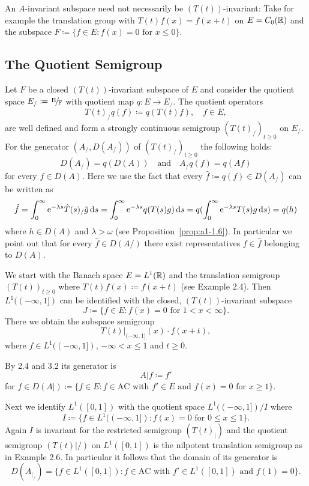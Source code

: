 An $A$-invariant subspace need not necessarily be $(T(t))$-invariant:
Take for example the translation group with $T(t)f(x) = f(x+t)$ on $E = C_{0}(\mathbb{R})$ and the subspace $F \coloneqq \{f \in E \colon f(x) = 0 \text{ for } x \leq 0\}$.
\subsection{The Quotient Semigroup}\label{subsec:a1-3.4}
Let $F$ be a closed $(T(t))$-invariant subspace of $E$ and consider the quotient space $ E_{/}\coloneqq \sfrac{E}{F} $ with quotient map $q \colon E \to E_{/}$. 
The quotient operators
\[
    T(t)_{/}q(f) \coloneqq q(T(t)f), \quad f \in E,
\]
are well defined and form a strongly continuous semigroup $(T(t)_{/})_{t \geq 0}$ on $E_{/}$.
For the generator $(A_{/},D(A_{/}))$ of $(T(t)_{/})_{t \geq 0}$ the following holds:
\[
    D(A_{/}) = q(D(A)) 
    \quad \text{and} \quad 
    A_{/}q(f) = q(Af)
\]
for every $f \in D(A)$.
Here we use the fact that every $\hat{f} \coloneqq q(f) \in D(A_{/})$ can be written as
\[
    \hat{f} = \int_{0}^{\infty}  \mathrm{e}^{-\lambda s} \hat{T}(s)_{/}\hat{g} \mathop{}\!\mathrm{d}{s} 
    = \int_{0}^{\infty}  \mathrm{e}^{-\lambda s}q(T(s)g) \mathop{}\!\mathrm{d}{s} 
    = q(\int_{0}^{\infty}  \mathrm{e}^{-\lambda s}T(s)g \mathop{}\!\mathrm{d}{s}) = q(h)
\]
where $h \in D(A)$ and $\lambda > \omega$ (see Proposition~\ref{prop:a1-1.6}).
In particular we point out that for every $\hat{f} \in D(A/)$ there exist representatives $f \in \hat{f}$ belonging to $D(A)$.
\begin{example*}\label{ex:a1-3.1}
We start with the Banach space $E = L^{1}(\mathbb{R})$ and the translation semigroup $(T(t))_{t \geq 0}$ where $T(t)f(x) \coloneqq f(x+t)$ (see Example 2.4).
Then $L^{1}((-\infty,1])$ can be identified with the closed, $(T(t))$-invariant subspace
\[
    J \coloneqq \{f \in E \colon f(x) = 0 \text{ for } 1 < x < \infty\} .
\]
There we obtain the subspace semigroup
\[
    T(t)|_{(-\infty,1]}(x) \cdot f(x+t),
\]
where $f \in L^{1}((-\infty,1])$, $-\infty < x \leq 1$ and $t \geq 0$.

By 2.4 and 3.2 its generator is
\[
    A|f \coloneqq f'
\]
for $f \in D(A|) \coloneqq \{f \in E \colon f \in \text{AC} \text{ with } f' \in E \text{ and } f(x) = 0 \text{ for } x \geq 1\}$.

Next we identify $L^{1}(\left[ 0,1 \right])$ with the quotient space $L^{1}((-\infty,1])/I$ where
\[
    I \coloneqq \{f \in L^{1}((-\infty,1]) \colon f(x) = 0 \text{ for } 0 \leq x \leq 1\} .
\]
Again $I$ is invariant for the restricted semigroup $(T(t)_{|})$ and the
quotient semigroup $(T(t)|/)$ on $L^{1}(\left[ 0,1 \right])$ is the nilpotent translation semigroup as in Example 2.6.
In particular it follows that the domain of its generator is
\[
    D(A_{|_{/}}) = \{f \in L^{1}(\left[ 0,1 \right]) \colon f \in \text{AC} \text{ with } f' \in L^{1}(\left[ 0,1 \right]) \text{ and } f(1) = 0\}.
\]
\end{example*}

